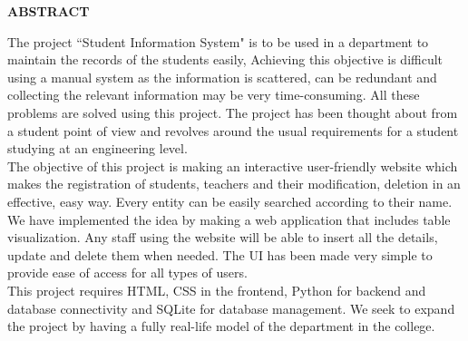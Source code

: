 \pagestyle{empty}
\begin{center}
\textup{\large{\textbf{ABSTRACT}}}
\end{center}

\justify
\indent
The project ``Student Information System" is to be used in a department to maintain the records of the students easily, Achieving this objective is difficult using a manual system as the information is scattered, can be redundant and collecting the relevant information may be very time-consuming. All these problems are solved using this project. The project has been thought about from a student point of view and revolves around the usual requirements for a student studying at an engineering level. 
\\[10pt]

The objective of this project is making an interactive user-friendly website which makes the registration of students, teachers and their modification, deletion in an effective, easy way. Every entity can be easily searched according to their name. We have implemented the idea by making a web application that includes table visualization. Any staff using the website will be able to insert all the details, update and delete them when needed. The UI has been made very simple to provide ease of access for all types of users.
\\[10pt]

This project requires HTML, CSS in the frontend, Python for backend and database connectivity and SQLite for database management. We seek to expand the project by having a fully real-life model of the department in the college. 

\pagebreak
